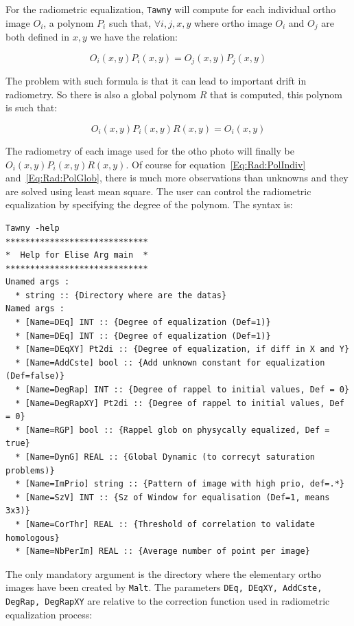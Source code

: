 For the radiometric equalization, {\tt Tawny}  will compute for each
individual ortho image $O_i$, a polynom $P_i$ such that, $\forall i,j,x,y$
where ortho image $O_i$ and $O_j$ are both defined in $x,y$ we have the relation:

\begin{equation}
   O_i(x,y) P_i(x,y) = O_j(x,y) P_j(x,y)
\label{Eq:Rad:PolIndiv}
\end{equation}


The problem with such formula is that it can lead to important drift in radiometry.
So there is also a global polynom $R$ that is computed, this polynom is such that:

\begin{equation}
   O_i(x,y) P_i(x,y) R(x,y) =  O_i(x,y)
\label{Eq:Rad:PolGlob}
\end{equation}

The radiometry of each image used for the otho photo will finally be $O_i(x,y) P_i(x,y) R(x,y)$.
Of course for equation~\ref{Eq:Rad:PolIndiv} and~\ref{Eq:Rad:PolGlob}, there is
much more observations than unknowns and they are solved using least mean square.
The user can control the radiometric equalization by specifying the 
degree of the polynom. The syntax is:




\begin{verbatim}
Tawny -help
*****************************
*  Help for Elise Arg main  *
*****************************
Unamed args : 
  * string :: {Directory where are the datas}
Named args : 
  * [Name=DEq] INT :: {Degree of equalization (Def=1)}
  * [Name=DEq] INT :: {Degree of equalization (Def=1)}
  * [Name=DEqXY] Pt2di :: {Degree of equalization, if diff in X and Y}
  * [Name=AddCste] bool :: {Add unknown constant for equalization (Def=false)}
  * [Name=DegRap] INT :: {Degree of rappel to initial values, Def = 0}
  * [Name=DegRapXY] Pt2di :: {Degree of rappel to initial values, Def = 0}
  * [Name=RGP] bool :: {Rappel glob on physycally equalized, Def = true}
  * [Name=DynG] REAL :: {Global Dynamic (to correcyt saturation problems)}
  * [Name=ImPrio] string :: {Pattern of image with high prio, def=.*}
  * [Name=SzV] INT :: {Sz of Window for equalisation (Def=1, means 3x3)}
  * [Name=CorThr] REAL :: {Threshold of correlation to validate homologous}
  * [Name=NbPerIm] REAL :: {Average number of point per image}
\end{verbatim}

The only mandatory argument is the directory where the 
elementary ortho images have been created by {\tt Malt}. The parameters
{\tt DEq, DEqXY, AddCste, DegRap, DegRapXY} are relative to the correction
function used in radiometric equalization process:

